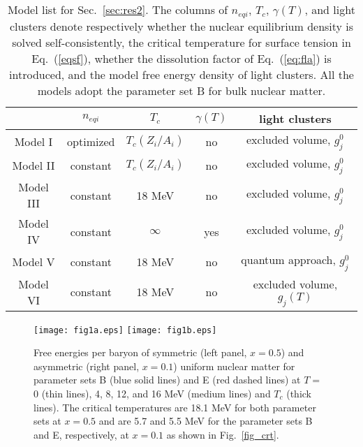 \documentclass[preprint]{revtex4}
\begin{document}
{{{\begin{table}[t]
\begin{tabular}{|c||c|c|c|c|}
\hline 
\hline
 \ & $n_{eqi}$ & $T_c$ & $\gamma(T)$ & light clusters\\
 \hline
Model I & optimized & $T_c(Z_i/A_i)$&  no & excluded volume, $g_j^0$  \\
Model II & constant & $T_c(Z_i/A_i)$ &  no & excluded volume, $g_j^0$  \\
Model III & constant & 18 MeV &  no & excluded volume, $g_j^0$  \\
Model IV & constant & $\infty$ &  yes & excluded volume, $g_j^0$  \\
\hline
Model V & constant & 18 MeV &  no & quantum approach, $g_j^0$  \\
Model VI & constant & 18 MeV &  no & excluded volume, $g_j(T)$  \\
 \hline
\hline
\end{tabular}
\caption{\label{tab2_model}%
Model list for Sec.~\ref{sec:res2}.
The columns of $n_{eqi}$, $T_c$,  $\gamma(T)$, and light clusters
denote respectively whether the nuclear equilibrium density is solved self-consistently, the critical temperature for surface tension in Eq.~(\ref{eqsf}), 
whether the dissolution factor of Eq.~(\ref{eq:fla})  is introduced, and the model free energy density of  light clusters. All the  models adopt the parameter set B for bulk nuclear matter.} 
\end{table}

%
\begin{figure}
\texttt{[image: fig1a.eps]}
\texttt{[image: fig1b.eps]}
\caption{Free energies per baryon of  symmetric (left panel, $x=0.5$)  and  asymmetric (right panel, $x=0.1$) uniform nuclear matter for parameter sets  B (blue solid lines) and E (red dashed  lines) at $T=$ 0 (thin lines), 4, 8, 12,  and 16 MeV (medium lines) and $T_c$ (thick lines). The critical temperatures are 18.1 MeV  for both parameter sets at $x=0.5$ and are 5.7 and 5.5 MeV for the parameter sets B and E,  respectively, at $x=0.1$ as shown in Fig.~\ref{fig_crt}.
}
\label{fig_blk}
\end{figure}



}}}
\end{document}
